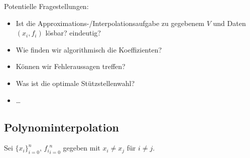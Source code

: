 \documentclass[11pt]{scrartcl}
\begin{document}
Potentielle Fragestellungen:
\begin{itemize}
	\item 
		Ist die Approximations-/Interpolationsaufgabe zu gegebenem $V$ und Daten $(x_i,f_i)$ lösbar? eindeutig?
	\item
		Wie finden wir algorithmisch die Koeffizienten?
	\item
		Können wir Fehleraussagen treffen?
	\item
		Was ist die optimale Stützstellenwahl?
	\item
		\dots
\end{itemize}


\subsection{Polynominterpolation}

Sei $\{x_i\}_{i=0}^n$, ${f_i}_{i=0}^n$ gegeben mit $x_i\neq x_j$ für $i\neq j$.
\end{document}
